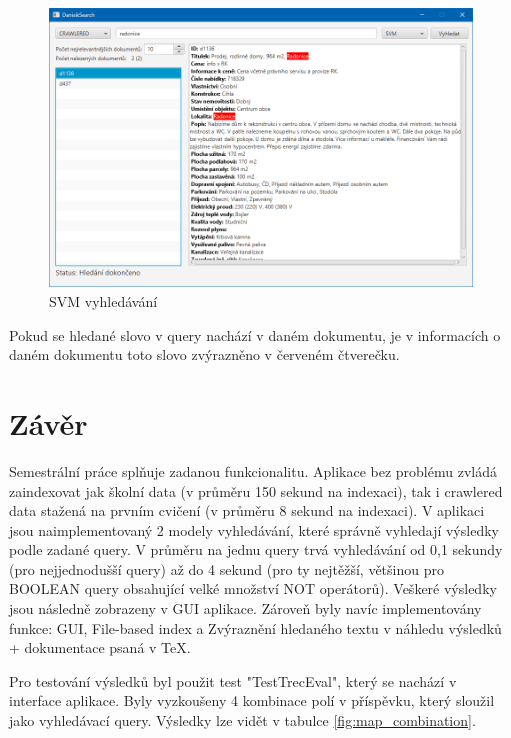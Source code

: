 \documentclass[12pt, a4paper]{article}
\begin{document}
\begin{figure}[h]
	\centering
	\includegraphics[width=15cm]{img/search_svm.png}
	\caption{SVM vyhledávání}
	\label{fig:search_svm}
\end{figure}

Pokud se hledané slovo v query nachází v daném dokumentu, je v informacích o daném dokumentu toto slovo zvýrazněno v červeném čtverečku.

\newpage

\section{Závěr}
Semestrální práce splňuje zadanou funkcionalitu. Aplikace bez problému zvládá zaindexovat jak školní data (v průměru 150 sekund na indexaci), tak i crawlered data stažená na prvním cvičení (v průměru 8 sekund na indexaci). V aplikaci jsou naimplementovaný 2 modely vyhledávání, které správně vyhledají výsledky podle zadané query. V průměru na jednu query trvá vyhledávání od 0,1 sekundy (pro nejjednodušší query) až do 4 sekund (pro ty nejtěžší, většinou pro BOOLEAN query obsahující velké množství NOT operátorů). Veškeré výsledky jsou následně zobrazeny v GUI aplikace. Zároveň byly navíc implementovány funkce: GUI, File-based index a Zvýraznění hledaného textu v náhledu výsledků + dokumentace psaná v TeX.

Pro testování výsledků byl použit test "TestTrecEval", který se nachází v interface aplikace. Byly vyzkoušeny 4 kombinace polí v příspěvku, který sloužil jako vyhledávací query. Výsledky lze vidět v tabulce \ref{fig:map_combination}.
\end{document}

